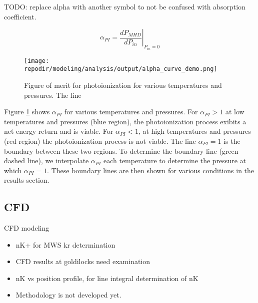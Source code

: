 TODO: replace alpha with another symbol to not be confused with absorption coefficient.


\begin{equation}
\alpha_{PI} = \left. \frac{{dP}_{MHD}}{{dP}_{in}} \right|_{P_{in}=0}
\end{equation}


\begin{figure}[h]
    \texttt{[image: \\repodir/modeling/analysis/output/alpha\_curve\_demo.png]} 
    \caption{Figure of merit for photoionization for various temperatures and pressures. The line}   
    \label{fig:alpha_line_demo}
\end{figure}

Figure \ref{fig:alpha_line_demo} shows $\alpha_{PI}$ for various temperatures and pressures.  For $\alpha_{PI} > 1$ at low temperatures and pressures (blue region), the photoionization process exibits a net energy return and is viable. For $\alpha_{PI} < 1$, at high temperatures and pressures (red region) the photoionization process is not viable. The line $\alpha_{PI} = 1$ is the boundary between these two regions. To determine the boundary line (green dashed  line), we interpolate $\alpha_{PI}$ each temperature to determine the pressure at which $\alpha_{PI} = 1$. These boundary lines are then shown for various conditions in the results section.

\subsection{CFD}

CFD modeling 

\begin{itemize}
\item nK+ for MWS kr determination
\item CFD results at goldilocks need examination
\item nK vs position profile, for line integral determination of nK
\item Methodology is not developed yet. 
\end{itemize}
